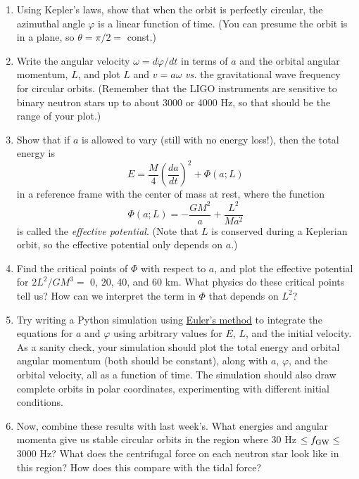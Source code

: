 \documentclass[11pt]{article}
\begin{document}
\begin{enumerate}

\item Using Kepler's laws, show that when the orbit is perfectly circular, the azimuthal angle $\varphi$ is a linear function of time. (You can presume the orbit is in a plane, so $\theta = \pi/2 =$ const.)

\item Write the angular velocity $\omega = d\varphi/dt$ in terms of $a$ and the orbital angular momentum, $L$, and plot $L$ and $v=a\omega$ \textit{vs.} the gravitational wave frequency for circular orbits. (Remember that the LIGO instruments are sensitive to binary neutron stars up to about 3000 or 4000 Hz, so that should be the range of your plot.)

\item Show that if $a$ is allowed to vary (still with no energy loss!), then the total energy is
\begin{equation}
E = \frac{M}{4}\left(\frac{da}{dt}\right)^2 + \Phi(a; L)
\end{equation}
in a reference frame with the center of mass at rest, where the function
\begin{equation}\label{eq:effective_potential}
\Phi(a; L) = - \frac{GM^2}{a} + \frac{L^2}{Ma^2}
\end{equation}
is called the \textit{effective potential}. (Note that $L$ is conserved during a Keplerian orbit, so the effective potential only depends on $a$.)

\item Find the critical points of $\Phi$ with respect to $a$, and plot the effective potential for $2L^2/GM^3 =$ 0, 20, 40, and 60 km. What physics do these critical points tell us? How can we interpret the term in $\Phi$ that depends on $L^2$?

\item Try writing a Python simulation using \href{https://en.wikipedia.org/wiki/Euler_method}{Euler's method} to integrate the equations for $a$ and $\varphi$ using arbitrary values for $E$, $L$, and the initial velocity. As a sanity check, your simulation should plot the total energy and orbital angular momentum (both should be constant), along with $a$, $\varphi$, and the orbital velocity, all as a function of time. The simulation should also draw complete orbits in polar coordinates, experimenting with different initial conditions.

\item Now, combine these results with last week's. What energies and angular momenta give us stable circular orbits in the region where 30 Hz $\leq f_{\rm GW} \leq$ 3000 Hz? What does the centrifugal force on each neutron star look like in this region? How does this compare with the tidal force?

\end{enumerate}
\end{document}
